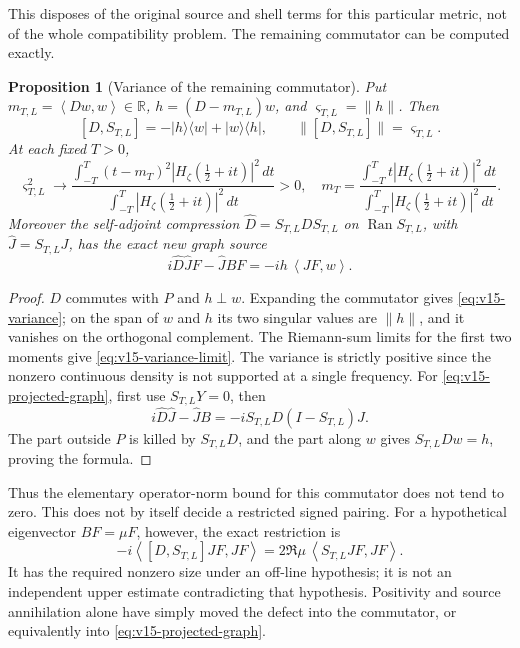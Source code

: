 \documentclass[11pt]{article}
\newtheorem{proposition}[theorem]{Proposition}
\theoremstyle{remark}
\newcommand{\ip}[2]{\left\langle #1,#2\right\rangle}
\begin{document}
This disposes of the original source and shell terms for this particular
metric, not of the whole compatibility problem. The remaining
commutator can be computed exactly.

\begin{proposition}[Variance of the remaining commutator]
\label{prop:v15-variance}
Put $m_{T,L}=\ip{Dw}{w}\in\mathbb R$, $h=(D-m_{T,L})w$, and
$\varsigma_{T,L}=\|h\|$. Then
\begin{equation}\label{eq:v15-variance}
 [D,S_{T,L}]=-|h\rangle\langle w|+|w\rangle\langle h|,
 \qquad \|[D,S_{T,L}]\|=\varsigma_{T,L}.
\end{equation}
At each fixed $T>0$,
\begin{equation}\label{eq:v15-variance-limit}
 \varsigma_{T,L}^2\longrightarrow
 \frac{\int_{-T}^T(t-m_T)^2|H_\zeta(\tfrac12+it)|^2\,dt}
      {\int_{-T}^T|H_\zeta(\tfrac12+it)|^2\,dt}>0,
 \quad
 m_T=\frac{\int_{-T}^T t|H_\zeta(\tfrac12+it)|^2\,dt}
              {\int_{-T}^T |H_\zeta(\tfrac12+it)|^2\,dt}.
\end{equation}
Moreover the self-adjoint compression $\widehat D=S_{T,L}DS_{T,L}$
on $\operatorname{Ran}S_{T,L}$, with $\widehat J=S_{T,L}J$, has
the exact new graph source
\begin{equation}\label{eq:v15-projected-graph}
 i\widehat D\widehat JF-\widehat JBF
       =-i h\,\ip{JF}{w}.
\end{equation}
\end{proposition}
\begin{proof}
$D$ commutes with $P$ and $h\perp w$. Expanding the commutator gives
\eqref{eq:v15-variance}; on the span of $w$ and $h$ its two singular
values are $\|h\|$, and it vanishes on the orthogonal complement.
The Riemann-sum limits for the first two moments give
\eqref{eq:v15-variance-limit}. The variance is strictly positive since
the nonzero continuous density is not supported at a single frequency.
For \eqref{eq:v15-projected-graph}, first use $S_{T,L}Y=0$, then
\[
 i\widehat D\widehat J-\widehat JB
 =-i S_{T,L}D(I-S_{T,L})J.
\]
The part outside $P$ is killed by $S_{T,L}D$, and the part along $w$
gives $S_{T,L}Dw=h$, proving the formula.
\end{proof}

Thus the elementary operator-norm bound for this commutator does not
tend to zero. This does not by itself decide a restricted signed pairing.
For a hypothetical eigenvector $BF=\mu F$, however, the exact restriction is
\[
 -i\ip{[D,S_{T,L}]JF}{JF}
       =2\Re\mu\,\ip{S_{T,L}JF}{JF}.
\]
It has the required nonzero size under an off-line hypothesis; it is not
an independent upper estimate contradicting that hypothesis. Positivity
and source annihilation alone have simply moved the defect into the
commutator, or equivalently into \eqref{eq:v15-projected-graph}.
\end{document}

